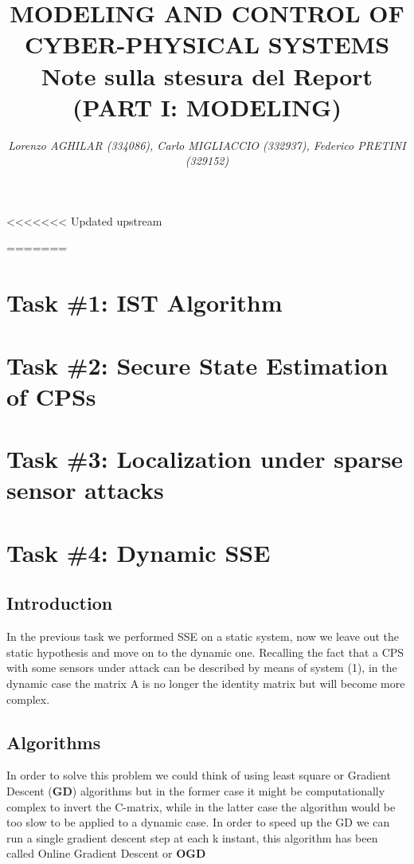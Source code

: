 \documentclass[a4paper,11pt]{article}
\begin{document}
    
    \title{
        \linespread{0.7}
        \vspace{-2.5cm}
        \textbf{
        {\large{MODELING AND CONTROL OF CYBER-PHYSICAL SYSTEMS}}\\
        {\Large{Note sulla stesura del Report}}
        \small{(PART I: MODELING)}
        }
    }
    
    \author{
        \textit{ 
        Lorenzo AGHILAR (334086),
        Carlo MIGLIACCIO (332937), 
        Federico PRETINI (329152)}
    }
    \date{}
    \clearpage\maketitle
    \thispagestyle{empty}

<<<<<<< Updated upstream
    
=======

    \section*{Task \#1: IST Algorithm}
    

    \section*{Task \#2: Secure State Estimation of CPSs}

    \section*{Task \#3: Localization under sparse sensor attacks}
    \newpage
    \section*{Task \#4: Dynamic SSE}
    \subsection*{Introduction}
    In the previous task we performed SSE on a static system, now we leave out the static hypothesis and move on to the dynamic one.
    Recalling the fact that a CPS with some sensors under attack can be described by means of system (1), in the dynamic case the matrix A is no longer the identity matrix but will become more complex.
    \subsection*{Algorithms}
    In order to solve this problem we could think of using least square or Gradient Descent (\textbf{GD}) algorithms but in the former case it might be computationally complex to invert the C-matrix, while in the latter case the algorithm would be too slow to be applied to a dynamic case.
    In order to speed up the GD we can run a single gradient descent step at each k instant, this algorithm has been called Online Gradient Descent or \textbf{OGD} 
\end{document}
